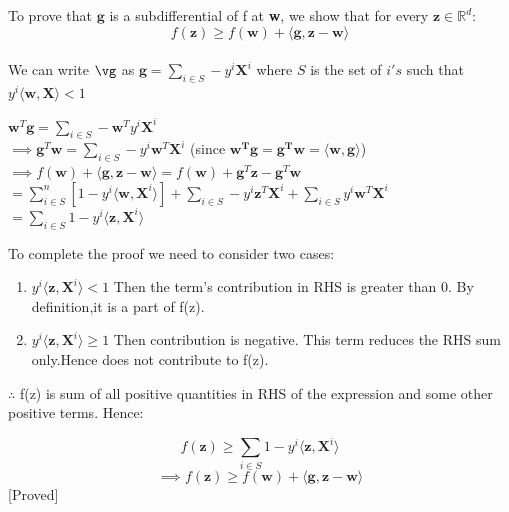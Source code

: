 \documentclass[a4paper,11pt]{article}
\begin{document}
\begin{mlsolution}

To prove that $\textbf{g}$ is a subdifferential of f at \textbf{w}, we show that for every $\textbf{z} \in \mathbb{R}^d$:
	$$ f(\textbf{z}) \geq f(\textbf{w}) + \langle\textbf{g}, \textbf{z} - \textbf{w}\rangle$$\\
We can write $\vg$ as $\textbf{g} = \sum\limits_{i \in S} -y^i\textbf{X}^i$ where $S$ is the set of $i's$ such that $y^i\langle\textbf{w}, \textbf{X}\rangle < 1$\\
	\begin{center}		
		$\textbf{w}^T\textbf{g} = \sum\limits_{i \in S} -\textbf{w}^T y^i\textbf{X}^i$\\
		$\implies \textbf{g}^T\textbf{w} = \sum\limits_{i \in S} -y^i\textbf{w}^T\textbf{X}^i$ (since $\mathbf{w^Tg = g^Tw = \langle w,g\rangle}$)\\
		$\implies f(\textbf{w}) + \langle\textbf{g}, \textbf{z} - \textbf{w}\rangle = f(\textbf{w}) + \textbf{g}^T\textbf{z} - \textbf{g}^T\textbf{w}$\\
				$= \sum\limits_{i \in S}^{n}[1 - y^i \langle\textbf{w}, \textbf{X}^i\rangle] + \sum\limits_{i \in S} -y^i\textbf{z}^T\textbf{X}^i + \sum\limits_{i \in S} y^i\textbf{w}^T\textbf{X}^i$\\
				$= \sum\limits_{i \in S} 1 - y^i \langle \textbf{z}, \textbf{X}^i\rangle$
	\end{center}
To complete the proof we need to consider two cases:
	\begin{enumerate}
	
		\item $y^i \langle \textbf{z},\textbf{X}^i\rangle < 1$ Then the term's contribution in RHS is greater than 0. By definition,it is a part of f(z).
		\item $y^i \langle \textbf{z},\textbf{X}^i\rangle \geq 1$ Then contribution is negative. This term reduces the RHS sum only.Hence does not contribute to f(z).
	\end{enumerate}
	$\therefore$ f(z) is sum of all positive quantities in RHS of the expression and some other positive terms. Hence:
	\begin{center}
				$$ f(\textbf{z}) \geq \sum\limits_{i \in S} 1 - y^i \langle \textbf{z}, \textbf{X}^i\rangle$$
			$$\implies f(\textbf{z}) \geq f(\textbf{w}) + \langle\textbf{g}, \textbf{z} - \textbf{w}\rangle$$ [Proved]
	\end{center}
\end{mlsolution}
\end{document}
